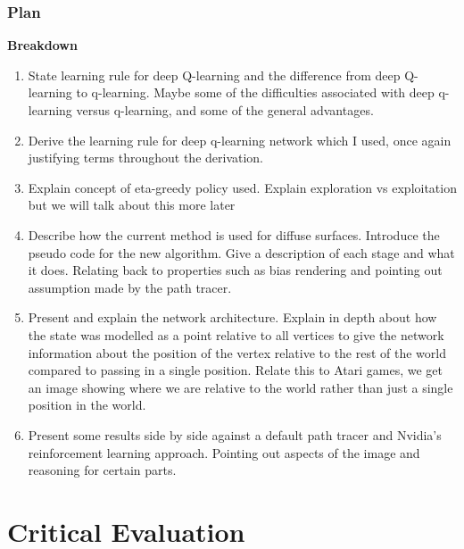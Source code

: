 \documentclass[ %
                    author={Callum Pearce},
                supervisor={Dr. Neill Campbell},
                    degree={MEng},
                     title={How effective are Temporal difference learning methods in reducing the number of zero contribution light paths in Path tracing?},
                  subtitle={},
                      type={research},
                      year={2019} ]{dissertation}
\begin{document}
\subsection{Plan}


\textbf{Breakdown}
\begin{enumerate}

\item State learning rule for deep Q-learning and the difference from deep Q-learning to q-learning. Maybe some of the difficulties associated with deep q-learning versus q-learning, and some of the general advantages. 

\item Derive the learning rule for deep q-learning network which I used, once again justifying terms throughout the derivation.

\item Explain concept of eta-greedy policy used. Explain exploration vs exploitation but we will talk about this more later

\item Describe how the current method is used for diffuse surfaces. Introduce the pseudo code for the new algorithm. Give a description of each stage and what it does. Relating back to properties such as bias rendering and pointing out assumption made by the path tracer.

\item Present and explain the network architecture. Explain in depth about how the state was modelled as a point relative to all vertices to give the network information about the position of the vertex relative to the rest of the world compared to passing in a single position. Relate this to Atari games, we get an image showing where we are relative to the world rather than just a single position in the world.

\item Present some results side by side against a default path tracer and Nvidia's reinforcement learning approach. Pointing out aspects of the image and reasoning for certain parts.

\end{enumerate}


\chapter{Critical Evaluation}
\label{chap:evaluation}
\end{document}
